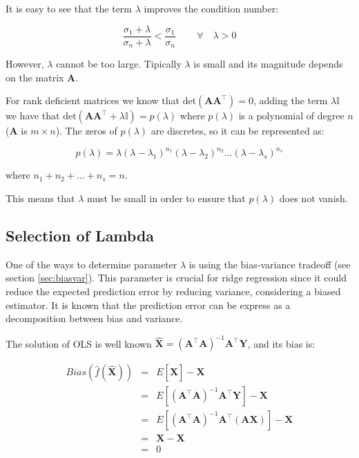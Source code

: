It is easy to see that the term $\lambda$ improves the condition number: 

\begin{equation*}
        \frac{\sigma_1+\lambda}{\sigma_n + \lambda} <
        \frac{\sigma_1}{\sigma_n} \,  \qquad \forall \quad \lambda > 0
\end{equation*}


However, $\lambda$ cannot be too large. Tipically $\lambda$ is small and its
magnitude depends on the matrix $\mathbf{A}$.

For rank deficient matrices we know that $\text{det}(\mathbf{A A^\top})=0$, adding the
term $\lambda \mathbb{I}$ we have that $\text{det}(\mathbf{A A^\top}+\lambda \mathbb{I}) =
p(\lambda)$ where $p(\lambda)$ is a polynomial of degree $n$ ($\mathbf{A}$ is
$m \times n$). The zeros of $p(\lambda)$ are discretes, so it can be represented
as:

\[
p(\lambda) =
\lambda(\lambda-\lambda_1)^{n_1}(\lambda-\lambda_2)^{n_2}\dots(\lambda-\lambda_s)^{n_s}
\]

\noindent where $n_1 + n_2 + \dots + n_s = n$.

This means that $\lambda$ must be small in order to ensure that $p(\lambda)$
does not vanish.


\subsection{Selection of Lambda}

One of the ways to determine parameter $\lambda$ is using the bias-variance tradeoff (see section \ref{sec:biasvar}). This parameter is crucial for ridge regression since it could
reduce the expected prediction error by reducing variance, considering a biased
estimator. 
It is known that the prediction error can be express as a decomposition between bias and variance.

The solution of OLS is well known $\hat{\mathbf{X}}=(\mathbf{A}^\top \mathbf{A})^{-1}\mathbf{A}^\top \mathbf{Y}$, and its bias is:

\begin{eqnarray*}
Bias(\hat{f}(\hat{\mathbf{X}})) &=& E[\hat{\mathbf{X}}] - \mathbf{X} \\
&=& E[ (\mathbf{A}^\top \mathbf{A})^{-1}\mathbf{A}^\top \mathbf{Y}] - \mathbf{X} \\
&=& E[ (\mathbf{A}^\top \mathbf{A})^{-1}\mathbf{A}^\top (\mathbf{AX})] - \mathbf{X}  \\
&=& \mathbf{X}  - \mathbf{X}  \\
&=&  0
\end{eqnarray*}


